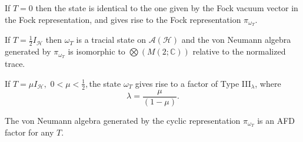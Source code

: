 \documentclass[aps,preprint]{revtex4}%
\begin{document}
If $T=0$ then the state is identical to the one given by the Fock vacuum
vector in the Fock representation, and gives rise to the Fock representation
$\pi_{\omega_{T}}.$

If $T=\frac{1}{2}I_{\mathcal{H}}$ then $\omega_{T}$ is a tracial state on
$\mathcal{A}\left(  \mathcal{H}\right)  $ and the von Neumann algebra
generated by $\pi_{\omega_{T}}$ is isomorphic to $%
{\displaystyle\bigotimes}
\left(  M\left(  2;\mathbb{C}\right)  \right)  $ relative to the normalized trace.

If $T=\mu I_{\mathcal{H}},$ $0<\mu<\frac{1}{2},$the state $\omega_{T}$ gives
rise to a factor of Type III$_{\lambda}$, where
\begin{equation}
\lambda=\frac{\mu}{\left(  1-\mu\right)  }.
\end{equation}


The von Neumann algebra generated by the cyclic representation $\pi
_{\omega_{T}}$ is an AFD factor for any $T.$
\end{document}
